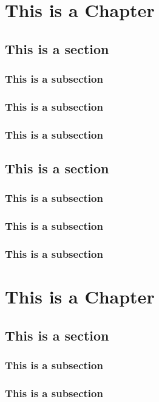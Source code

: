 \documentclass[11pt,oneside]{book}
\begin{document}
\chapter{This is a Chapter}

\section{This is a section}

\subsection{This is a subsection}
\subsection{This is a subsection}
\subsection{This is a subsection}

\section{This is a section}

\subsection{This is a subsection}
\subsection{This is a subsection}
\subsection{This is a subsection}

\chapter{This is a Chapter}

\section{This is a section}

\subsection{This is a subsection}
\subsection{This is a subsection}
\end{document}

